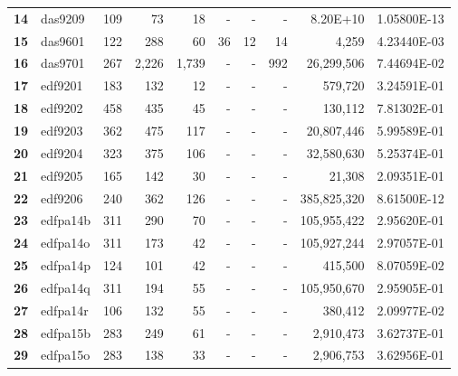 \begin{longtable}{@{}llrrrrrrrc@{}}
\textbf{14} & das9209  & 109                  & 73       & 18      & -    & -    & -     & 8.20E+10             & 1.05800E-13 \\
\textbf{15} & das9601  & 122                  & 288      & 60      & 36   & 12   & 14    & 4,259                & 4.23440E-03 \\
\textbf{16} & das9701  & 267                  & 2,226    & 1,739   & -    & -    & 992   & 26,299,506           & 7.44694E-02 \\
\textbf{17} & edf9201  & 183                  & 132      & 12      & -    & -    & -     & 579,720              & 3.24591E-01 \\
\textbf{18} & edf9202  & 458                  & 435      & 45      & -    & -    & -     & 130,112              & 7.81302E-01 \\
\textbf{19} & edf9203  & 362                  & 475      & 117     & -    & -    & -     & 20,807,446           & 5.99589E-01 \\
\textbf{20} & edf9204  & 323                  & 375      & 106     & -    & -    & -     & 32,580,630           & 5.25374E-01 \\
\textbf{21} & edf9205  & 165                  & 142      & 30      & -    & -    & -     & 21,308               & 2.09351E-01 \\
\textbf{22} & edf9206  & 240                  & 362      & 126     & -    & -    & -     & 385,825,320          & 8.61500E-12 \\
\textbf{23} & edfpa14b & 311                  & 290      & 70      & -    & -    & -     & 105,955,422          & 2.95620E-01 \\
\textbf{24} & edfpa14o & 311                  & 173      & 42      & -    & -    & -     & 105,927,244          & 2.97057E-01 \\
\textbf{25} & edfpa14p & 124                  & 101      & 42      & -    & -    & -     & 415,500              & 8.07059E-02 \\
\textbf{26} & edfpa14q & 311                  & 194      & 55      & -    & -    & -     & 105,950,670          & 2.95905E-01 \\
\textbf{27} & edfpa14r & 106                  & 132      & 55      & -    & -    & -     & 380,412              & 2.09977E-02 \\
\textbf{28} & edfpa15b & 283                  & 249      & 61      & -    & -    & -     & 2,910,473            & 3.62737E-01 \\
\textbf{29} & edfpa15o & 283                  & 138      & 33      & -    & -    & -     & 2,906,753            & 3.62956E-01 \\

\end{longtable}
